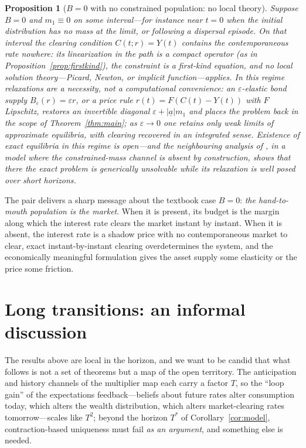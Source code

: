 \documentclass[11pt]{article}
\newtheorem{proposition}[theorem]{Proposition}
\theoremstyle{definition}
\theoremstyle{remark}
\newcommand{\ubar}[1]{\underline{#1}}
\newcommand{\uba}{\ubar{a}}
\begin{document}
\begin{proposition}[$B=0$ with no constrained population: no local
theory]\label{prop:notheorem}
Suppose $B=0$ and $m_1\equiv0$ on some interval---for instance near
$t=0$ when the initial distribution has no mass at the limit, or
following a dispersal episode. On that interval the clearing
condition $C(t;r)=Y(t)$ contains the contemporaneous rate
\emph{nowhere}: its linearization in the path is a compact operator
(as in Proposition~\ref{prop:firstkind}), the constraint is a
first-kind equation, and no local solution theory---Picard, Newton,
or implicit function---applies. In this regime relaxations are a
necessity, not a computational convenience: an $\varepsilon$-elastic
bond supply $B_\varepsilon(r)=\varepsilon r$, or a price rule
$r(t)=F(C(t)-Y(t))$ with $F$ Lipschitz, restores an invertible
diagonal $\varepsilon+|\uba|m_1$ and places the problem back in the
scope of Theorem~\ref{thm:main}; as $\varepsilon\to0$ one retains
only weak limits of approximate equilibria, with clearing recovered
in an integrated sense. Existence of exact equilibria in this regime
is open---and the neighbouring analysis of \citet{Ambrose2021}, in a
model where the constrained-mass channel is absent by construction,
shows that there the exact problem is generically \emph{unsolvable}
while its relaxation is well posed over short horizons.
\end{proposition}

The pair delivers a sharp message about the textbook case $B=0$:
\emph{the hand-to-mouth population is the market}. When it is
present, its budget is the margin along which the interest rate
clears the market instant by instant. When it is absent, the interest
rate is a shadow price with no contemporaneous market to clear, exact
instant-by-instant clearing overdetermines the system, and the
economically meaningful formulation gives the asset supply some
elasticity or the price some friction.

\section{Long transitions: an informal discussion}
\label{sec:long}

The results above are local in the horizon, and we want to be candid
that what follows is not a set of theorems but a map of the open
territory. The anticipation and history channels of the multiplier
map each carry a factor $T$, so the ``loop gain'' of the expectations
feedback---beliefs about future rates alter consumption today, which
alters the wealth distribution, which alters market-clearing rates
tomorrow---scales like $T^2$; beyond the horizon $T^*$ of
Corollary~\ref{cor:model}, contraction-based uniqueness must fail
\emph{as an argument}, and something else is needed.
\end{document}
